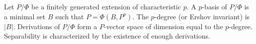 Let $P/\Phi$ be a finitely generated extension of characteristic $p$. A $p$-basis of $P/\Phi$ is a minimal set $B$ such that $P = \Phi(B, P^p)$. The $p$-degree (or Ershov invariant) is $|B|$. Derivations of $P/\Phi$ form a $P$-vector space of dimension equal to the $p$-degree. Separability is characterized by the existence of enough derivations.
